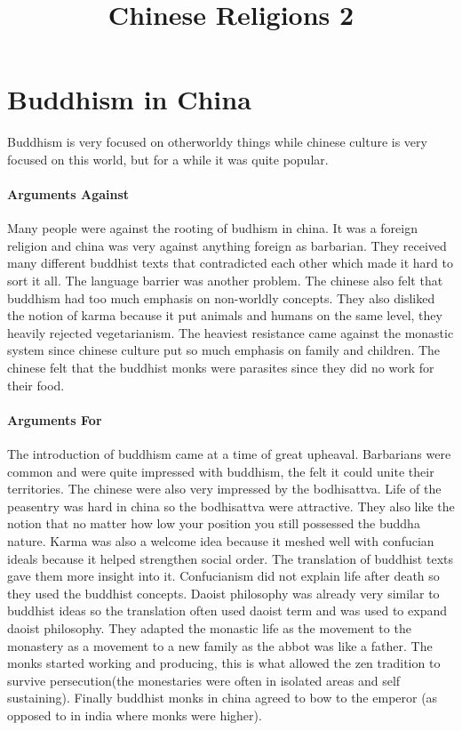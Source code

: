 \documentclass{article}
\begin{document}
\title{Chinese Religions 2}
\maketitle
\section*{Buddhism in China}
\label{sec:buddhism_in_china}
Buddhism is very focused on otherworldy things while chinese culture is very focused on this world, but for a while it was quite popular.

\paragraph{Arguments Against}
\label{par:arguments_against}
Many people were against the rooting of budhism in china. It was a foreign religion and china was very against anything foreign as barbarian. They received many different buddhist texts that contradicted each other which made it hard to sort it all. The language barrier was another problem. The chinese also felt that buddhism had too much emphasis on non-worldly concepts. They also disliked the notion of karma because it put animals and humans on the same level, they heavily rejected vegetarianism. The heaviest resistance came against the monastic system since chinese culture put so much emphasis on family and children. The chinese felt that the buddhist monks were parasites since they did no work for their food.

\paragraph{Arguments For}
\label{par:arguments_for}
The introduction of buddhism came at a time of great upheaval. Barbarians were common and were quite impressed with buddhism, the felt it could unite their territories. The chinese were also very impressed by the bodhisattva. Life of the peasentry was hard in china so the bodhisattva were attractive. They also like the notion that no matter how low your position you still possessed the buddha nature. Karma was also a welcome idea because it meshed well with confucian ideals because it helped strengthen social order. The translation of buddhist texts gave them more insight into it. Confucianism did not explain life after death so they used the buddhist concepts. Daoist philosophy was already very similar to buddhist ideas so the translation often used daoist term and was used to expand daoist philosophy. They adapted the monastic life as the movement to the monastery as a movement to a new family as the abbot was like a father. The monks started working and producing, this is what allowed the zen tradition to survive persecution(the monestaries were often in isolated areas and self sustaining). Finally buddhist monks in china agreed to bow to the emperor (as opposed to in india where monks were higher).
\end{document}
